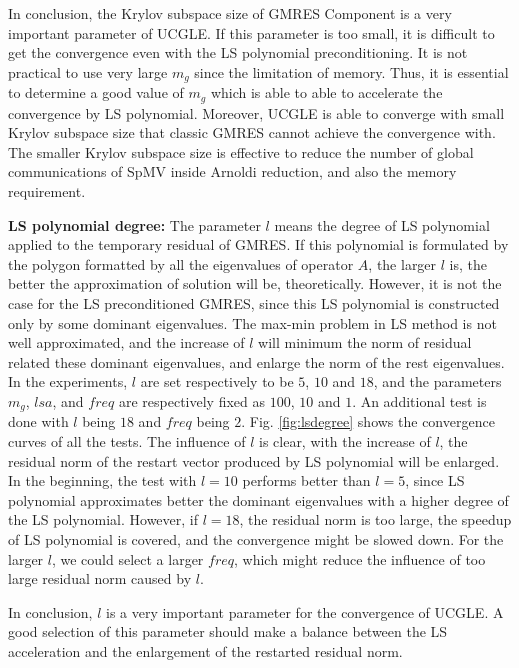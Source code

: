 In conclusion, the Krylov subspace size of GMRES Component is a very important parameter of UCGLE. If this parameter is too small, it is difficult to get the convergence even with the LS polynomial preconditioning. It is not practical to use very large $m_g$ since the limitation of memory. Thus, it is essential to determine a good value of $m_g$ which is able to able to accelerate the convergence by LS polynomial. Moreover, UCGLE is able to converge with small Krylov subspace size that  classic GMRES cannot achieve the convergence with. The smaller Krylov subspace size is effective to reduce the number of global communications of SpMV inside Arnoldi reduction, and also the memory requirement.

\textbf{LS polynomial degree: }The parameter $l$  means the degree of  LS polynomial applied to the temporary residual of GMRES. If this polynomial is formulated by the polygon formatted by all the eigenvalues of operator $A$, the larger $l$ is, the better the approximation of solution will be, theoretically. However, it is not the case for the LS preconditioned GMRES, since this LS polynomial is constructed only by some dominant eigenvalues. The max-min problem in LS method is not well approximated, and the increase of $l$ will minimum the norm of residual related these dominant eigenvalues, and enlarge the norm of the rest eigenvalues. In the experiments, $l$ are set respectively to be $5$, $10$ and $18$, and the parameters $m_g$, $lsa$, and $freq$ are respectively fixed as $100$, $10$ and $1$.  An additional test is done with $l$ being $18$ and $freq$ being $2$. Fig. \ref{fig:lsdegree} shows the convergence curves of all the tests. The influence of $l$ is clear, with the increase of $l$, the residual norm of the restart vector produced by LS polynomial will be enlarged. In the beginning, the test with $l=10$ performs better than $l=5$, since LS polynomial approximates better the dominant eigenvalues with a higher degree of the LS polynomial. However, if $l=18$, the residual norm is too large, the speedup of LS polynomial is covered, and the convergence might be slowed down.  For the larger $l$, we could select a larger $freq$, which might reduce the influence of too large residual norm caused by $l$. 

In conclusion, $l$ is a very important parameter for the convergence of UCGLE. A good selection of this parameter should make a balance between the LS acceleration and the enlargement of the restarted residual norm.

